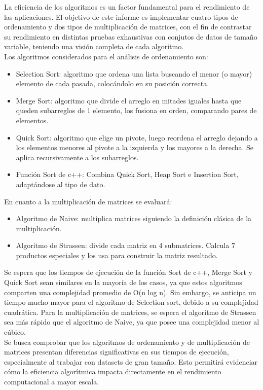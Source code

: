 La eficiencia de los algoritmos es un factor fundamental para el rendimiento de las aplicaciones. El objetivo de este informe es implementar cuatro tipos de ordenamiento y dos tipos de multiplicación de matrices, con el fin de contrastar su rendimiento en distintas pruebas exhaustivas con conjutos de datos de tamaño variable, teniendo una visión completa de cada algoritmo.\\
Los algoritmos considerados para el análisis de ordenamiento son:
\begin{itemize}
    \item Selection Sort: algoritmo que ordena una lista buscando el menor (o mayor) elemento de cada pasada, colocándolo en su posición correcta.
    \item Merge Sort: algoritmo que divide el arreglo en mitades iguales hasta que queden subarreglos de 1 elemento, los fusiona en orden, comparando pares de elementos.
    \item Quick Sort: algoritmo que elige un pivote, luego reordena el arreglo dejando a los elementos menores al pivote a la izquierda y los mayores a la derecha. Se aplica recursivamente a los subarreglos.
    \item Función Sort de c++: Combina Quick Sort, Heap Sort e Insertion Sort, adaptándose al tipo de dato.
\end{itemize}
En cuanto a la multiplicación de matrices se evaluará:
\begin{itemize}
    \item Algoritmo de Naive: multiplica matrices siguiendo la definición clásica de la multiplicación.
    \item Algoritmo de Strassen: divide cada matriz en 4 submatrices. Calcula 7 productos especiales y los usa para construir la matriz resultado.
\end{itemize}
Se espera que los tiempos de ejecución de la función Sort de c++, Merge Sort y Quick Sort sean similares en la mayoría de los casos, ya que estos algoritmos comparten una complejidad promedio de O(n log n). Sin embargo, se anticipa un tiempo mucho mayor para el algoritmo de Selection sort, debido a su complejidad cuadrática. Para la multiplicación de matrices, se espera el algoritmo de Strassen sea más rápido que el algoritmo de Naive, ya que posee una complejidad menor al cúbico. \\
Se busca comprobar que los algoritmos de ordenamiento y de multiplicación de matrices presentan diferencias significativas en sus tiempos de ejecución, especialmente al trabajar con datasets de gran tamaño. Esto permitirá evidenciar cómo la eficiencia algorítmica impacta directamente en el rendimiento computacional a mayor escala.
